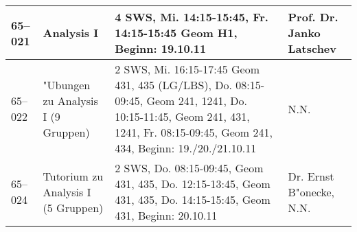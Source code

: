 \begin{tabularx}{\textwidth}{|l|X|X|X|}
\hline 65--021 	& Analysis I
								& 4 SWS, Mi. 14:15-15:45, Fr. 14:15-15:45 Geom H1, Beginn: 19.10.11
								& Prof. Dr. Janko Latschev \\
								
\hline 65--022 	& "Ubungen zu Analysis I (9 Gruppen)
								& 2 SWS, Mi. 16:15-17:45 Geom 431, 435 (LG/LBS), Do. 08:15-09:45, Geom 241, 1241, Do. 10:15-11:45, Geom 241, 431, 1241, Fr. 08:15-09:45, Geom 241, 434, Beginn: 19./20./21.10.11         
								& N.N. \\
								
\hline 65--024 	& Tutorium zu Analysis I (5 Gruppen)
								& 2 SWS, Do. 08:15-09:45, Geom 431, 435, Do. 12:15-13:45, Geom 431, 435, Do. 14:15-15:45, Geom 431, Beginn: 20.10.11
								& Dr. Ernst B"onecke, N.N. \\
\hline
\end{tabularx}

